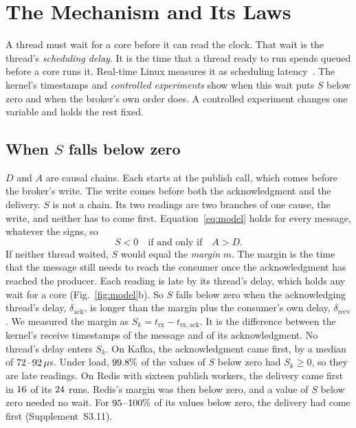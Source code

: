 \documentclass[10pt,journal,compsoc]{IEEEtran}
\newcommand{\kafka}{Kafka}
\newcommand{\redis}{Redis}
\begin{document}
\section{The Mechanism and Its Laws}
\label{sec:mechanism}

A thread must wait for a core before it can read the clock. That wait is the thread's
\emph{scheduling delay}\label{def:scheddelay}. It is the time that a thread ready to run spends
queued before a core runs it. Real-time Linux measures it as scheduling
latency~\cite{bristot2025timerlat}. The kernel's timestamps and \emph{controlled experiments} show
when this wait puts $S$ below zero and when the broker's own order does. A controlled experiment
changes one variable and holds the rest fixed.

\subsection{When $S$ falls below zero}
\label{sec:proxy}
\label{sec:model}
$D$ and $A$ are causal chains. Each starts at the publish call, which comes before the broker's
write. The write comes before both the acknowledgment and the delivery. $S$ is not a chain.
Its two readings are two branches of one cause, the write, and neither has to come first.
Equation~\ref{eq:model} holds for every message, whatever the signs, so
\begin{equation}
S < 0 \quad\text{if and only if}\quad A > D .
\label{eq:negspan}
\end{equation}
If neither thread waited, $S$ would equal the \emph{margin}\label{def:margin} $m$. The margin is the
time that the message still needs to reach the consumer once the acknowledgment has reached the
producer. Each reading is late by its thread's delay, which holds any wait for a core
(Fig.~\ref{fig:model}b). So $S$ falls below zero when the acknowledging thread's delay,
$\delta_{\mathrm{ack}}$, is longer than the margin plus the consumer's own delay,
$\delta_{\mathrm{recv}}$. We measured the margin as $S_k = t_{\mathrm{rx}} - t_{\mathrm{rx,ack}}$.
It is the difference between the kernel's receive timestamps of the message and of its
acknowledgment.
No thread's delay enters $S_k$. On \kafka{}, the acknowledgment came first, by a median of
$72$--$92\,\mu$s.  Under load, $99.8\%$ of the values of
$S$ below zero had $S_k \geq 0$, so they are late readings. On \redis{} with sixteen publish
workers, the delivery came first in $16$ of its $24$ runs. \redis{}'s margin was then below zero,
and a value of $S$ below zero needed no wait. For $95$--$100\%$ of
its values below zero, the delivery had come first (Supplement~S3.11).
\end{document}
